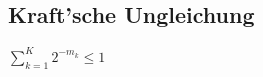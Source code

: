 \begin{multicols}{2}

\subsection*{Kraft'sche Ungleichung}
$\displaystyle \sum_{k=1}^{K} 2^{-m_k} \le 1$




\end{multicols}